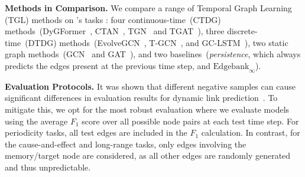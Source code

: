 
 \textbf{Methods in Comparison.} We compare a range of Temporal Graph Learning (TGL) methods  on \benchmarkname's tasks
: four continuous-time~(CTDG) methods~(DyGFormer~\cite{dygformer}, CTAN~\cite{ctan}, TGN~\cite{tgn} and TGAT~\cite{tgat}), three discrete-time~(DTDG) methods~(EvolveGCN~\cite{evolvegcn}, T-GCN~\cite{tgcn}, and GC-LSTM~\cite{gclstm}), two static graph methods~(GCN~\citep{gcn} and GAT~\cite{gat}), and two baselines~(\textit{persistence}, which always predicts the edges present at the previous time step, and $\text{Edgebank}_{\infty}$\citep{poursafaei2022betterevaluationdynamiclink}). 



\textbf{Evaluation Protocols.}
It was shown that different negative samples can cause significant differences in evaluation results for dynamic link prediction~\cite{poursafaei2022betterevaluationdynamiclink}. To mitigate this, we opt for the most robust evaluation where we evaluate models using the average $F_1$ score over all possible node pairs at each test time step. For periodicity tasks, all test edges are included in the $F_1$ calculation. In contrast, for the cause-and-effect and long-range tasks, only edges involving the memory/target node are considered, as all other edges are randomly generated and thus unpredictable. 

